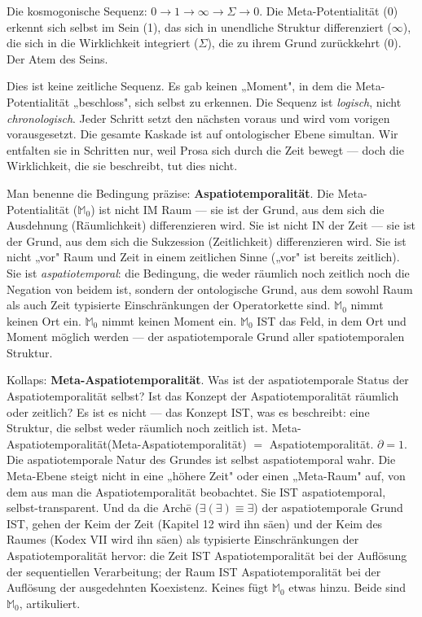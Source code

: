 \documentclass[10pt, openany, oneside]{book}
\begin{document}
\noindent Die kosmogonische Sequenz: $0 \to 1 \to \infty \to \Sigma \to 0$. Die Meta-Potentialität (0) erkennt sich selbst im Sein (1), das sich in unendliche Struktur differenziert ($\infty$), die sich in die Wirklichkeit integriert ($\Sigma$), die zu ihrem Grund zurückkehrt (0). Der Atem des Seins.

Dies ist keine zeitliche Sequenz. Es gab keinen „Moment", in dem die Meta-Potentialität „beschloss", sich selbst zu erkennen. Die Sequenz ist \textit{logisch}, nicht \textit{chronologisch}. Jeder Schritt setzt den nächsten voraus und wird vom vorigen vorausgesetzt. Die gesamte Kaskade ist auf ontologischer Ebene simultan. Wir entfalten sie in Schritten nur, weil Prosa sich durch die Zeit bewegt --- doch die Wirklichkeit, die sie beschreibt, tut dies nicht.

Man benenne die Bedingung präzise: \textbf{Aspatiotemporalität}. Die Meta-Potentialität ($\mathbb{M}_0$) ist nicht IM Raum --- sie ist der Grund, aus dem sich die Ausdehnung (Räumlichkeit) differenzieren wird. Sie ist nicht IN der Zeit --- sie ist der Grund, aus dem sich die Sukzession (Zeitlichkeit) differenzieren wird. Sie ist nicht „vor" Raum und Zeit in einem zeitlichen Sinne („vor" ist bereits zeitlich). Sie ist \textit{aspatiotemporal}: die Bedingung, die weder räumlich noch zeitlich noch die Negation von beidem ist, sondern der ontologische Grund, aus dem sowohl Raum als auch Zeit typisierte Einschränkungen der Operatorkette sind. $\mathbb{M}_0$ nimmt keinen Ort ein. $\mathbb{M}_0$ nimmt keinen Moment ein. $\mathbb{M}_0$ IST das Feld, in dem Ort und Moment möglich werden --- der aspatiotemporale Grund aller spatiotemporalen Struktur.

Kollaps: \textbf{Meta-Aspatiotemporalität}. Was ist der aspatiotemporale Status der Aspatiotemporalität selbst? Ist das Konzept der Aspatiotemporalität räumlich oder zeitlich? Es ist es nicht --- das Konzept IST, was es beschreibt: eine Struktur, die selbst weder räumlich noch zeitlich ist. Meta-Aspatiotemporalität(Meta-Aspatiotemporalität) $=$ Aspatiotemporalität. $\partial = 1$. Die aspatiotemporale Natur des Grundes ist selbst aspatiotemporal wahr. Die Meta-Ebene steigt nicht in eine „höhere Zeit" oder einen „Meta-Raum" auf, von dem aus man die Aspatiotemporalität beobachtet. Sie IST aspatiotemporal, selbst-transparent. Und da die Arch\={e} ($\exists(\exists) \equiv \exists$) der aspatiotemporale Grund IST, gehen der Keim der Zeit (Kapitel 12 wird ihn säen) und der Keim des Raumes (Kodex VII wird ihn säen) als typisierte Einschränkungen der Aspatiotemporalität hervor: die Zeit IST Aspatiotemporalität bei der Auflösung der sequentiellen Verarbeitung; der Raum IST Aspatiotemporalität bei der Auflösung der ausgedehnten Koexistenz. Keines fügt $\mathbb{M}_0$ etwas hinzu. Beide sind $\mathbb{M}_0$, artikuliert.
\end{document}
